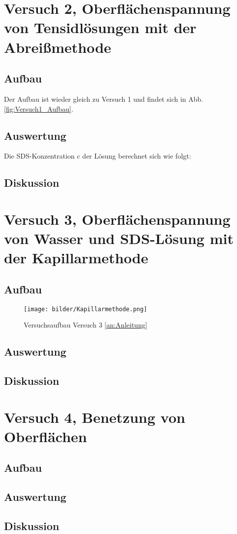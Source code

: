         \section{Versuch 2, Oberflächenspannung von Tensidlösungen mit der Abreißmethode}

        \subsection{Aufbau}
        Der Aufbau ist wieder gleich zu Versuch 1 und findet sich in Abb. \ref{fig:Versuch1_Aufbau}. 

        \subsection{Auswertung}
        Die SDS-Konzentration $\mathrm{c}$ der Lösung berechnet sich wie folgt:

        \subsection{Diskussion}

        \section{Versuch 3, Oberflächenspannung von Wasser und SDS-Lösung mit der Kapillarmethode}

       \subsection{Aufbau}

       \begin{figure}[H]
           \centering
           \texttt{[image: bilder/Kapillarmethode.png]}
           \caption{Versuchsaufbau Versuch 3 \ref{an:Anleitung}}
           \label{fig:Versuch3_Aufbau}
         \end{figure}
       \subsection{Auswertung}
         \subsection{Diskussion}

         \section{Versuch 4, Benetzung von Oberflächen}

         \subsection{Aufbau}
            \subsection{Auswertung}
            \subsection{Diskussion}
